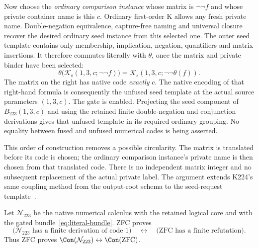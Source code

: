 Now choose the \emph{ordinary comparison instance} whose matrix is
$\neg\neg f$ and whose private container name is this $c$.  Ordinary
first-order K allows any fresh private name.  Double-negation equivalence,
capture-free naming and universal closure recover the desired ordinary
seed instance from this selected one.  The outer seed template contains
only membership, implication, negation, quantifiers and matrix
insertions.  It therefore commutes literally with $\theta$, once the
matrix and private binder have been selected:
\begin{equation}
 \theta\bigl(\mathcal K_{\mathrm s}(1,3,c;\neg\neg f)\bigr)
   =\mathcal K_{\mathrm s}(1,3,c;\neg\neg\theta(f)).
 \label{eq:ks-theta-commutes}
\end{equation}
The matrix on the right has native code \emph{exactly} $c$.
The native encoding of that right-hand formula is consequently the
unfused seed template at the actual source parameters $(1,3,c)$.
The gate is enabled.  Projecting the seed component of
$B_{223}(1,3,c)$ and using the retained finite double-negation and
conjunction derivations gives that unfused template in its required
ordinary grouping.  No equality between fused and unfused numerical
codes is being asserted.

This order of construction removes a possible circularity.  The matrix
is translated before its code is chosen; the ordinary comparison
instance's private name is then chosen from that translated code.  There
is no independent matrix integer and no subsequent replacement of the
actual private label.  The argument extends K224's same coupling method
from the output-root schema to the seed-request template~\cite{k224}.

\begin{theorem}
\label{thm:ks-native-calibration}
Let $\mathcal N_{223}$ be the native numerical calculus with the retained
logical core and with the gated bundle~\eqref{eq:literal-bundle}.
ZFC proves
\[
 \bigl(\mathcal N_{223}\text{ has a finite derivation of code }1\bigr)
 \quad\longleftrightarrow\quad
 \bigl(\mathrm{ZFC}\text{ has a finite refutation}\bigr).
\]
Thus ZFC proves
$\Con(\mathcal N_{223})\leftrightarrow\Con(\mathrm{ZFC})$.
\end{theorem}

